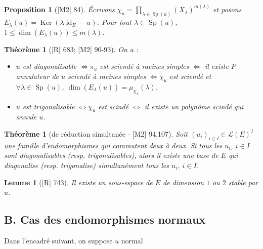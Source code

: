 \documentclass[10pt, a4paper, parskip=full, twoside, twocolumn]{report}
\newtheorem{theorem}[definition]{Théorème}
\newtheorem{proposition}[definition]{Proposition}
\newtheorem{lemma}[definition]{Lemme}
\DeclareMathOperator{\Ker}{Ker}
\DeclareMathOperator{\id}{id}
\DeclareMathOperator{\Sp}{Sp}
\begin{document}
\begin{proposition}[\textnormal{[M2] 84}]
	Écrivons $\chi_u = \prod_{\lambda\in\Sp(u)} \left(X_\lambda\right)^{m(\lambda)}$
	et posons $E_{\lambda}(u)=\Ker(\lambda\id_E - u)$.
	Pour tout $\lambda\in \Sp(u)$, $1\leq \dim(E_{\lambda}(u))\leq m(\lambda)$.
\end{proposition}

\begin{theorem}[\textnormal{[R] 683; [M2] 90-93}]
	On a :
	\begin{itemize}
		\item $u$ est diagonalisable $\iff \pi_u$ est sciendé à racines simples $\iff$ il existe $P$ annulateur de $u$ sciendé à racines simples $\iff \chi_u$ est sciendé et $\forall\lambda\in\Sp(u)$, $\dim(E_{\lambda}(u)) = \mu_{\chi_u}(\lambda)$.
		\item $u$ est trigonalisable $\iff \chi_u$ est scindé $\iff$ il existe un polynôme scindé qui annule $u$.
	\end{itemize}
\end{theorem}

\begin{theorem}[de réduction simultanée - \textnormal{[M2] 94,107}]
	Soit $\left(u_i\right)_{i\in I}\in\mathcal{L}(E)^I$ une famille d'endomorphismes qui commutent deux à deux.
	Si tous les $u_i$, $i\in I$ sont diagonalisables (resp. trigonalisables), alors il existe une base de $E$ qui 
	diagonalise (resp. trigonalise) simultanément tous les $u_i$, $i\in I$.
\end{theorem}


\begin{tcolorbox}[
    breakable, %
    colback=developpement, %
    colframe=gray!0!black, %
    boxrule=0pt, %
    arc=1mm, %
	boxsep=0pt,
	left=0pt, right=0pt, top=0pt, bottom=0pt
]
\begin{lemma}[\textnormal{[R] 743}]
	\label{151dev11}
	Il existe un sous-espace de $E$ de dimension $1$ ou $2$ stable par $u$.
\end{lemma}
\end{tcolorbox}

\subsection*{B. Cas des endomorphismes normaux}
\textcolor{paragraphtext}{Dans l'encadré suivant, on suppose $u$ normal}
\end{document}
